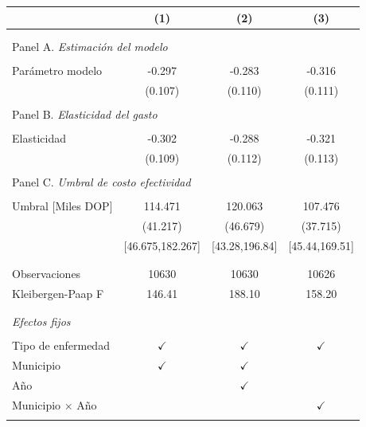 \begin{tabular}{l c  c c}
\toprule[1.5pt]
\multicolumn{1}{c}{\textbf{}} & \textbf{(1)} & \textbf{(2)} & \textbf{(3)}  \\ \hline \\
\\
\multicolumn{4}{l}{Panel A. \textit{Estimación del modelo}}\\
\\
Parámetro modelo & -0.297  & -0.283 & -0.316  \\
& (0.107)  & (0.110) & (0.111)  \\
\\
\multicolumn{4}{l}{Panel B. \textit{Elasticidad del gasto}}\\
\\
Elasticidad & -0.302 & -0.288 & -0.321  \\
& (0.109)  & (0.112) & (0.113)  \\
\\
\multicolumn{4}{l}{Panel C. \textit{Umbral de costo efectividad}}\\
\\
Umbral [Miles DOP] & 114.471  & 120.063 & 107.476  \\
& (41.217) & (46.679) & (37.715)  \\
& [46.675,182.267]  & [43.28,196.84]  & [45.44,169.51]   \\
\\
\midrule[1 pt]
\\
Observaciones & 10630 &  10630 & 10626 \\
Kleibergen-Paap F & 146.41 & 188.10 & 158.20 \\
\\
\midrule[1 pt]
\\
\multicolumn{4}{l}{\textit{Efectos fijos}} \\
\\
Tipo de enfermedad & $\checkmark$ & $\checkmark$ & $\checkmark$ \\
Municipio & $\checkmark$   & $\checkmark$ & \\
Año &   & $\checkmark$ &  \\
Municipio $\times$ Año &    &  & $\checkmark$ \\
\\
\midrule[1 pt]
\end{tabular}

